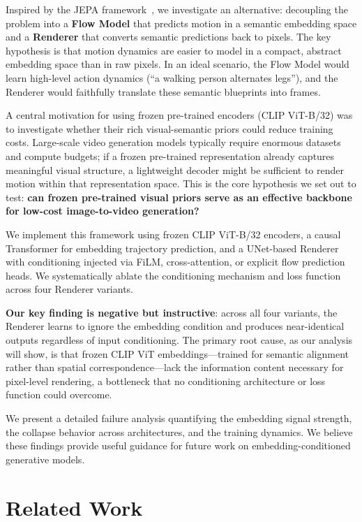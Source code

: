 \documentclass[10pt,twocolumn,letterpaper]{article}
\begin{document}
Inspired by the JEPA framework~\cite{lecun2022}, we investigate an alternative: decoupling
the problem into a \textbf{Flow Model} that predicts motion in a semantic
embedding space and a \textbf{Renderer} that converts semantic predictions
back to pixels. The key hypothesis is that motion dynamics are easier to
model in a compact, abstract embedding space than in raw pixels. In an
ideal scenario, the Flow Model would learn high-level action dynamics (``a
walking person alternates legs''), and the Renderer would faithfully
translate these semantic blueprints into frames.

A central motivation for using frozen pre-trained encoders (CLIP ViT-B/32)
was to investigate whether their rich visual-semantic priors could reduce
training costs. Large-scale video generation models typically require
enormous datasets and compute budgets; if a frozen pre-trained
representation already captures meaningful visual structure, a lightweight
decoder might be sufficient to render motion within that representation
space. This is the core hypothesis we set out to test: \textbf{can frozen
pre-trained visual priors serve as an effective backbone for low-cost
image-to-video generation?}

We implement this framework using frozen CLIP ViT-B/32 encoders, a causal
Transformer for embedding trajectory prediction, and a UNet-based Renderer
with conditioning injected via FiLM, cross-attention, or explicit flow
prediction heads. We systematically ablate the conditioning mechanism and
loss function across four Renderer variants.

\textbf{Our key finding is negative but instructive}: across all four variants,
the Renderer learns to ignore the embedding condition and produces
near-identical outputs regardless of input conditioning. The primary root
cause, as our analysis will show, is that frozen CLIP ViT embeddings---trained
for semantic alignment rather than spatial correspondence---lack the
information content necessary for pixel-level rendering, a bottleneck that
no conditioning architecture or loss function could overcome.

We present a detailed failure analysis quantifying the embedding signal
strength, the collapse behavior across architectures, and the training
dynamics. We believe these findings provide useful guidance for future work
on embedding-conditioned generative models.

\section{Related Work}
\end{document}
